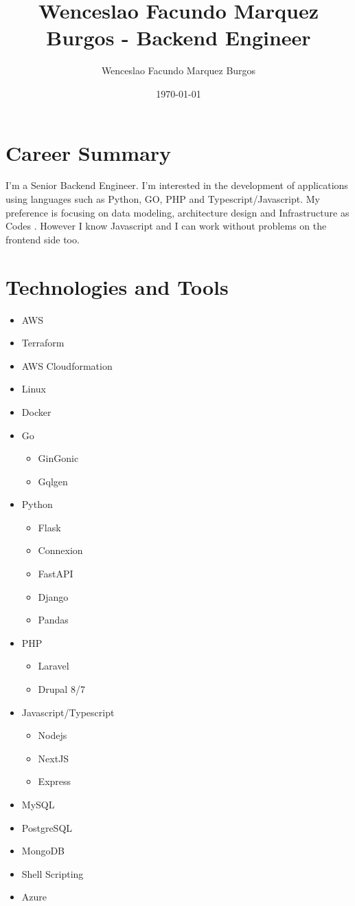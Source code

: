 \documentclass[11pt]{article}
\author{Wenceslao Facundo Marquez Burgos}
\date{\today}
\title{Wenceslao Facundo Marquez Burgos - Backend Engineer}
\begin{document}
\maketitle
\tableofcontents


\section{Career Summary}
\label{sec:org7c8517e}

I'm a Senior Backend Engineer. I'm interested in the development of applications using languages such as Python, GO, PHP and Typescript/Javascript.
My preference is focusing on data modeling, architecture design and Infrastructure as Codes . However I know Javascript and I can work without problems on the frontend side too.

\section{Technologies and Tools}
\label{sec:orgfa94ce6}
\begin{itemize}
\item AWS
\item Terraform
\item AWS Cloudformation
\item Linux
\item Docker
\item Go
\begin{itemize}
\item GinGonic
\item Gqlgen
\end{itemize}
\item Python
\begin{itemize}
\item Flask
\item Connexion
\item FastAPI
\item Django
\item Pandas
\end{itemize}
\item PHP
\begin{itemize}
\item Laravel
\item Drupal 8/7
\end{itemize}
\item Javascript/Typescript
\begin{itemize}
\item Nodejs
\item NextJS
\item Express
\end{itemize}
\item MySQL
\item PostgreSQL
\item MongoDB
\item Shell Scripting
\item Azure
\end{itemize}
\end{document}
